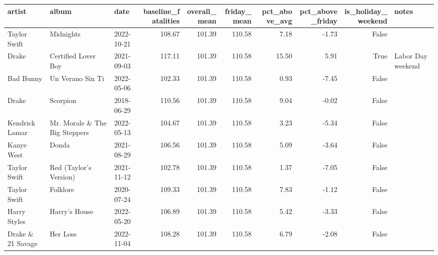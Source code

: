 \begin{tabular}{lllrrrrrrl}
\toprule
artist & album & date & baseline\_fatalities & overall\_mean & friday\_mean & pct\_above\_avg & pct\_above\_friday & is\_holiday\_weekend & notes \\
\midrule
Taylor Swift & Midnights & 2022-10-21 & 108.67 & 101.39 & 110.58 & 7.18 & -1.73 & False &  \\
Drake & Certified Lover Boy & 2021-09-03 & 117.11 & 101.39 & 110.58 & 15.50 & 5.91 & True & Labor Day weekend \\
Bad Bunny & Un Verano Sin Ti & 2022-05-06 & 102.33 & 101.39 & 110.58 & 0.93 & -7.45 & False &  \\
Drake & Scorpion & 2018-06-29 & 110.56 & 101.39 & 110.58 & 9.04 & -0.02 & False &  \\
Kendrick Lamar & Mr. Morale \& The Big Steppers & 2022-05-13 & 104.67 & 101.39 & 110.58 & 3.23 & -5.34 & False &  \\
Kanye West & Donda & 2021-08-29 & 106.56 & 101.39 & 110.58 & 5.09 & -3.64 & False &  \\
Taylor Swift & Red (Taylor's Version) & 2021-11-12 & 102.78 & 101.39 & 110.58 & 1.37 & -7.05 & False &  \\
Taylor Swift & Folklore & 2020-07-24 & 109.33 & 101.39 & 110.58 & 7.83 & -1.12 & False &  \\
Harry Styles & Harry's House & 2022-05-20 & 106.89 & 101.39 & 110.58 & 5.42 & -3.33 & False &  \\
Drake \& 21 Savage & Her Loss & 2022-11-04 & 108.28 & 101.39 & 110.58 & 6.79 & -2.08 & False &  \\
\bottomrule
\end{tabular}

